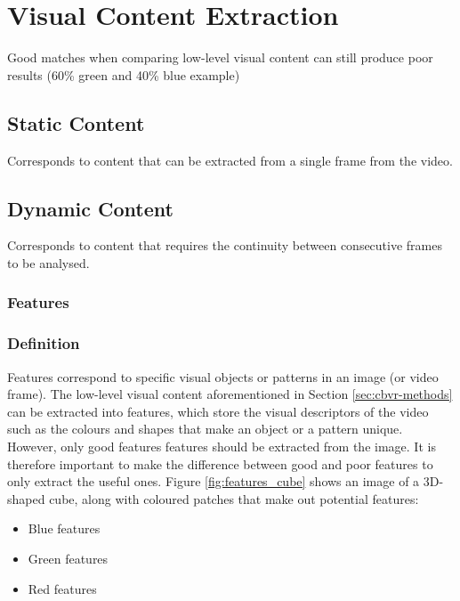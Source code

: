 \documentclass[11pt,openany,a4paper]{article}
\begin{document}
\clearpage \section{Visual Content Extraction}

Good matches when comparing low-level visual content can still produce poor results (60\% green and 40\% blue example) \cite{petkovic2000}

\subsection{Static Content}
\label{sec:static-content}

Corresponds to content that can be extracted from a single frame from the video.

\subsection{Dynamic Content}

Corresponds to content that requires the continuity between consecutive frames to be analysed.

\subsubsection{Features}
\label{sec:features}

\subsubsection{Definition}
\label{sec:feature-definition}

Features correspond to specific visual objects or patterns in an image (or video frame). The low-level visual content aforementioned in Section \ref{sec:cbvr-methods} can be extracted into features, which store the visual descriptors of the video such as the colours and shapes \cite{petkovic2000} that make an object or a pattern unique. However, only good features features should be extracted from the image. It is therefore important to make the difference between good and poor features to only extract the useful ones. Figure \ref{fig:features_cube} shows an image of a 3D-shaped cube, along with coloured patches that make out potential features:
\begin{itemize}
	\item Blue features
	\item Green features
	\item Red features
\end{itemize}
\end{document}
